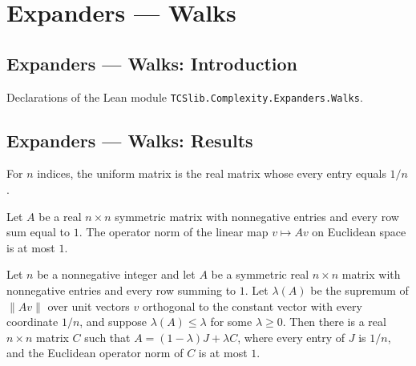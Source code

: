 \section{Expanders --- Walks}
\subsection*{Expanders --- Walks: Introduction}

Declarations of the Lean module \texttt{TCSlib.Complexity.Expanders.Walks}.

\subsection*{Expanders --- Walks: Results}

\begin{definition}
\label{Expander.unifMatrix}
\leanok
For $n$ indices, the uniform matrix is the real matrix whose every entry equals $1/n$.
\end{definition}

\begin{theorem}
\label{Expander.opNorm_le_one}
\leanok
{}
Let $A$ be a real $n\times n$ symmetric matrix with nonnegative entries and every row
sum equal to $1$. The operator norm of the linear map $v\mapsto Av$ on Euclidean space
is at most $1$.
\end{theorem}

\begin{theorem}
\label{Expander.exists_decomposition}
\leanok
{}
Let $n$ be a nonnegative integer and let $A$ be a symmetric real $n\times n$ matrix with
nonnegative entries and every row summing to $1$. Let $\lambda(A)$ be the supremum of
$\|Av\|$ over unit vectors $v$ orthogonal to the constant vector with every coordinate
$1/n$, and suppose $\lambda(A)\leq \lambda$ for some $\lambda\geq 0$. Then there is a
real $n\times n$ matrix $C$ such that $A=(1-\lambda)J+\lambda C$, where every entry of
$J$ is $1/n$, and the Euclidean operator norm of $C$ is at most $1$.
\end{theorem}

